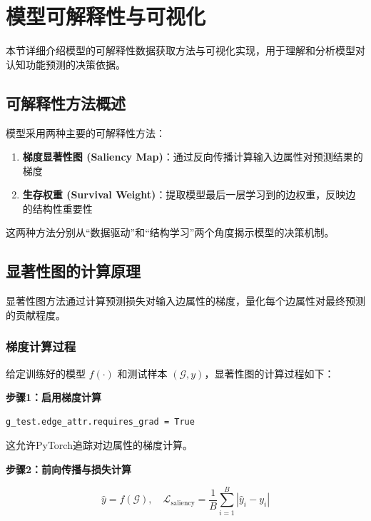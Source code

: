 \newpage

\section{模型可解释性与可视化}

本节详细介绍模型的可解释性数据获取方法与可视化实现，用于理解和分析模型对认知功能预测的决策依据。

\subsection{可解释性方法概述}

模型采用两种主要的可解释性方法：

\begin{enumerate}
    \item \textbf{梯度显著性图 (Saliency Map)}：通过反向传播计算输入边属性对预测结果的梯度
    \item \textbf{生存权重 (Survival Weight)}：提取模型最后一层学习到的边权重，反映边的结构性重要性
\end{enumerate}

这两种方法分别从``数据驱动''和``结构学习''两个角度揭示模型的决策机制。

\subsection{显著性图的计算原理}

显著性图方法通过计算预测损失对输入边属性的梯度，量化每个边属性对最终预测的贡献程度。

\subsubsection{梯度计算过程}

给定训练好的模型 $f(\cdot)$ 和测试样本 $(\mathcal{G}, y)$，显著性图的计算过程如下：

\textbf{步骤1：启用梯度计算}

\begin{verbatim}
g_test.edge_attr.requires_grad = True
\end{verbatim}

这允许PyTorch追踪对边属性的梯度计算。

\textbf{步骤2：前向传播与损失计算}

\begin{equation}
\hat{y} = f(\mathcal{G}), \quad \mathcal{L}_{\text{saliency}} = \frac{1}{B} \sum_{i=1}^{B} | \hat{y}_i - y_i |
\end{equation}


